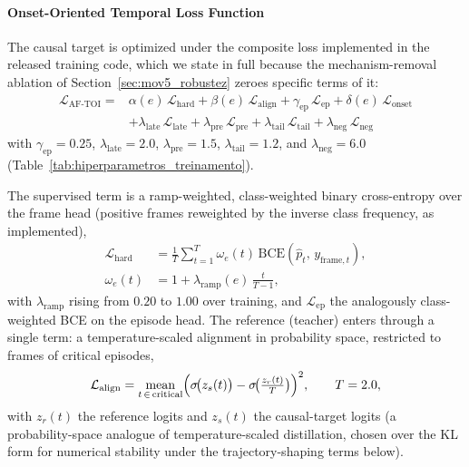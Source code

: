 \documentclass[a4paper,fleqn]{cas-dc}
\begin{document}
\paragraph{Onset-Oriented Temporal Loss Function}
{\color{\revcolor}The causal target is optimized under the composite loss
implemented in the released training code, which we state in full because the
mechanism-removal ablation of Section~\ref{sec:mov5_robustez} zeroes specific
terms of it:
\begin{equation}
\begin{aligned}
  \mathcal{L}_{\mathrm{AF\text{-}TOI}} ={}& \alpha(e)\,\mathcal{L}_{\text{hard}}
    + \beta(e)\,\mathcal{L}_{\text{align}}
    + \gamma_{\mathrm{ep}}\,\mathcal{L}_{\text{ep}}
    + \delta(e)\,\mathcal{L}_{\text{onset}} \\
    &+ \lambda_{\text{late}}\,\mathcal{L}_{\text{late}}
    + \lambda_{\text{pre}}\,\mathcal{L}_{\text{pre}}
    + \lambda_{\text{tail}}\,\mathcal{L}_{\text{tail}}
    + \lambda_{\text{neg}}\,\mathcal{L}_{\text{neg}}
\end{aligned}
  \label{eq:perda_total_aftoi}
\end{equation}
with $\gamma_{\mathrm{ep}}{=}0.25$, $\lambda_{\text{late}}{=}2.0$,
$\lambda_{\text{pre}}{=}1.5$, $\lambda_{\text{tail}}{=}1.2$, and
$\lambda_{\text{neg}}{=}6.0$ (Table~\ref{tab:hiperparametros_treinamento}).

The supervised term is a ramp-weighted, class-weighted binary cross-entropy
over the frame head (positive frames reweighted by the inverse class
frequency, as implemented),
\begin{equation}
\begin{aligned}
  \mathcal{L}_{\text{hard}} &= \frac{1}{T}\sum_{t=1}^{T} \omega_e(t)\,
    \mathrm{BCE}\!\left(\hat{p}_t,\, y_{\text{frame},t}\right), \\
  \omega_e(t) &= 1 + \lambda_{\mathrm{ramp}}(e)\,\tfrac{t}{T-1},
\end{aligned}
  \label{eq:perda_hard_aftoi}
\end{equation}
with $\lambda_{\mathrm{ramp}}$ rising from $0.20$ to $1.00$ over training, and
$\mathcal{L}_{\text{ep}}$ the analogously class-weighted BCE on the episode head. The reference
(teacher) enters through a single term: a temperature-scaled alignment in
probability space, restricted to frames of critical episodes,
\begin{equation}
  \mathcal{L}_{\text{align}} = \operatorname*{mean}_{t \,\in\, \text{critical}}
    \Bigl(\sigma\!\bigl(z_s(t)\bigr) -
    \sigma\!\bigl(\tfrac{z_r(t)}{T}\bigr)\Bigr)^{2}, \qquad T = 2.0,
  \label{eq:perda_soft_aftoi}
\end{equation}
with $z_r(t)$ the reference logits and $z_s(t)$ the causal-target logits (a
probability-space analogue of temperature-scaled distillation, chosen over the
KL form for numerical stability under the trajectory-shaping terms below).

}
\end{document}
